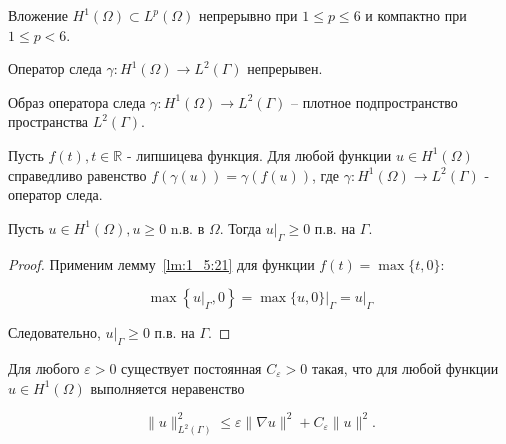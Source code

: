 \begin{lemma}
    \label{lm:1_5:embedding}\cite[1026]{Zeidler1990b}
    Вложение $H^{1}(\Omega) \subset L^{p}(\Omega)$ непрерывно
    при $1 \leq p \leq 6$ и компактно при $1 \leq p<6$.
\end{lemma}


\begin{lemma}
    \label{lm:1_5:19}\cite[239]{Zeidler1990a}
    Оператор следа $\gamma: H^{1}(\Omega) \rightarrow L^{2}(\Gamma)$ непрерывен.
\end{lemma}

\begin{lemma}
    \label{lm:1_5:20}\cite[4]{girault1979finite}
    Образ оператора следа $\gamma: H^{1}(\Omega) \rightarrow L^{2}(\Gamma)$
    -- плотное подпространство пространства $L^{2}(\Gamma)$.
\end{lemma}

\begin{lemma}
    \label{lm:1_5:21}\cite{berninger2009non}
    Пусть $f(t), t \in \mathbb{R}$ - липшицева функция.
    Для любой функции $u \in H^{1}(\Omega)$ справедливо равенство
    $f(\gamma(u))=\gamma(f(u))$, где
    $\gamma: H^{1}(\Omega) \rightarrow L^{2}(\Gamma)$ - оператор следа.
\end{lemma}

\begin{lemma}
    \label{lm:1_5:22}
    Пусть $u \in H^{1}(\Omega), u \geq 0$ n.в. в $\Omega$.
    Тогда $\left.u\right|_{\Gamma} \geq 0$ п.в. на $\Gamma$.
\end{lemma}

\begin{proof}
    Применим лемму~\ref{lm:1_5:21} для функции $f(t)=\max \{t, 0\}$:

    \[
        \max \left\{\left.u\right|_{\Gamma},
        0\right\}=\left.\max \{u, 0\}\right|_{\Gamma}=\left.u\right|_{\Gamma}
    \]


    Следовательно, $\left.u\right|_{\Gamma} \geq 0$ п.в. на $\Gamma$.
\end{proof}

\begin{lemma}
    \label{lm:1_5:23}\cite[41]{grisvard1985elliptic}
    Для любого $\varepsilon>0$ существует постоянная $C_{\varepsilon}>0$ такая,
    что для любой функции $u \in H^{1}(\Omega)$ выполняется неравенство

    \[
        \|u\|_{L^{2}(\Gamma)}^{2} \leq \varepsilon\|\nabla u\|^{2}
        +C_{\varepsilon}\|u\|^{2}.
    \]

\end{lemma}

